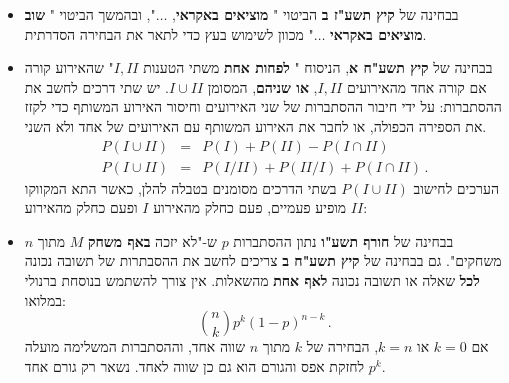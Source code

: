 \documentclass[12pt,a4paper]{article}
\newcommand{\bover}[1]{\bm{\overline{#1}}}
\begin{document}
\begin{itemize}

\item
בבחינה של
\textbf{קיץ תשע"ז ב}
הביטוי "%
\textbf{מוציאים באקראי},
$\ldots$",
ובהמשך הביטוי "%
\textbf{שוב מוציאים באקראי}
$\ldots$"
מכוון לשימוש בעץ כדי לתאר את הבחירה הסדרתית.


\item
בבחינה של
\textbf{קיץ תשע"ח א},
הניסוח "%
\textbf{לפחות אחת}
משתי הטענות 
$I, II$"
שהאירוע קורה אם קורה אחד מהאירועים
$I, II$,
\textbf{או שניהם},
המסומן 
$I \cup II$.
יש שתי דרכים לחשב את ההסתברות: על ידי חיבור ההסתברות של שני האירועים וחיסור האירוע המשותף כדי לקזז את הספירה הכפולה, או לחבר את האירוע המשותף עם האירועים של אחד ולא השני.
\begin{eqnarray*}
P(I \cup II) &=& P(I) + P(II) - P(I \cap II)\\
P(I \cup II) &=& P(I/ II) + P(II/ I) + P(I \cap II)\,.
\end{eqnarray*}
הערכים לחישוב
$P(I \cup II)$
בשתי הדרכים מסומנים בטבלה להלן, כאשר התא המקווקו מופיע פעמיים, פעם כחלק מהאירוע
$I$
ופעם כחלק מהאירוע
$II$:
\begin{center}
\end{center}


\item
בבחינה של
\textbf{חורף תשע"ו}
נתון ההסתברות
$p$
ש-"לא יזכה
\textbf{באף משחק}
$M$
מתוך 
$n$
משחקים". גם בבחינה של 
\textbf{קיץ תשע"ח ב}
צריכים לחשב את ההסבתרות של תשובה נכונה 
\textbf{לכל}
שאלה או תשובה נכונה
\textbf{לאף אחת}
מהשאלות.  אין צורך להשתמש בנוסחת ברנולי במלואו:
\[
{n \choose k}p^k(1-p)^{n-k}\,.
\]
אם
$k=0$
או
$k=n$,
הבחירה של
$k$
מתוך 
$n$
שווה אחד, וההסתברות המשלימה מועלה לחזקת אפס והגורם הוא גם כן שווה לאחד. נשאר רק גורם אחד 
$p^k$.


\end{itemize}
\end{document}
